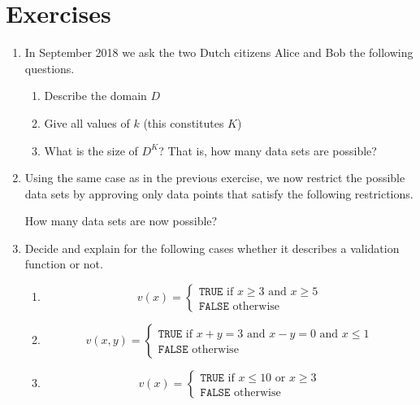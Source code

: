 \section{Exercises}
\label{sect:exvalidation}

\begin{enumerate}
\item In September 2018 we ask the two Dutch citizens Alice and
      Bob the following questions.
  \begin{enumerate}
    \item Describe the domain $D$
    \item Give all values of $k$ (this constitutes $K$)
    \item What is the size of $D^K$? That is, how many data sets are possible?
  \end{enumerate}

\item Using the same case as in the previous exercise, we now restrict the
      possible data sets by approving only data points
      that satisfy the following restrictions.
How many data sets are now possible?

\item Decide and explain for the following cases whether it describes a validation 
function or not.
  \begin{enumerate}
  \item 
    $$
    v(x) = \left\{\begin{array}{l}
    \texttt{TRUE} \textrm{ if } x \geq 3 \textrm{ and } x \geq 5 \\
    \texttt{FALSE} \textrm{ otherwise}
    \end{array}
    \right.
    $$
  \item 
    $$
    v(x,y) = \left\{\begin{array}{l}
    \texttt{TRUE} \textrm{ if } x + y = 3\textrm{ and } x-y = 0\textrm{ and }x \leq1\\
    \texttt{FALSE} \textrm{ otherwise}
    \end{array}
    \right.
    $$
  \item
    $$
    v(x) = \left\{\begin{array}{l}
    \texttt{TRUE} \textrm{ if } x \leq 10 \textrm{ or } x \geq 3\\
    \texttt{FALSE} \textrm{ otherwise}
    \end{array}
    \right.
    $$
  \end{enumerate}


\end{enumerate}
